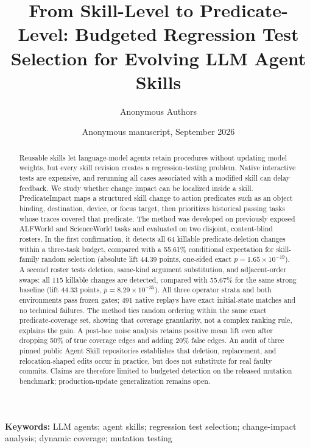\documentclass[10pt]{article}
\title{From Skill-Level to Predicate-Level: Budgeted Regression Test Selection for Evolving LLM Agent Skills}
\author{Anonymous Authors}
\date{Anonymous manuscript, September 2026}
\begin{document}
\maketitle

\begin{abstract}
Reusable skills let language-model agents retain procedures without updating model weights, but every skill revision creates a regression-testing problem. Native interactive tests are expensive, and rerunning all cases associated with a modified skill can delay feedback. We study whether change impact can be localized inside a skill. PredicateImpact maps a structured skill change to action predicates such as an object binding, destination, device, or focus target, then prioritizes historical passing tasks whose traces covered that predicate. The method was developed on previously exposed ALFWorld and ScienceWorld tasks and evaluated on two disjoint, content-blind rosters. In the first confirmation, it detects all 64 killable predicate-deletion changes within a three-task budget, compared with a 55.61\% conditional expectation for skill-family random selection (absolute lift 44.39 points, one-sided exact $p=1.65\times10^{-19}$). A second roster tests deletion, same-kind argument substitution, and adjacent-order swaps: all 115 killable changes are detected, compared with 55.67\% for the same strong baseline (lift 44.33 points, $p=8.29\times10^{-35}$). All three operator strata and both environments pass frozen gates; 491 native replays have exact initial-state matches and no technical failures. The method ties random ordering within the same exact predicate-coverage set, showing that coverage granularity, not a complex ranking rule, explains the gain. A post-hoc noise analysis retains positive mean lift even after dropping 50\% of true coverage edges and adding 20\% false edges. An audit of three pinned public Agent Skill repositories establishes that deletion, replacement, and relocation-shaped edits occur in practice, but does not substitute for real faulty commits. Claims are therefore limited to budgeted detection on the released mutation benchmark; production-update generalization remains open.
\end{abstract}

\noindent\textbf{Keywords:} LLM agents; agent skills; regression test selection; change-impact analysis; dynamic coverage; mutation testing
\end{document}
